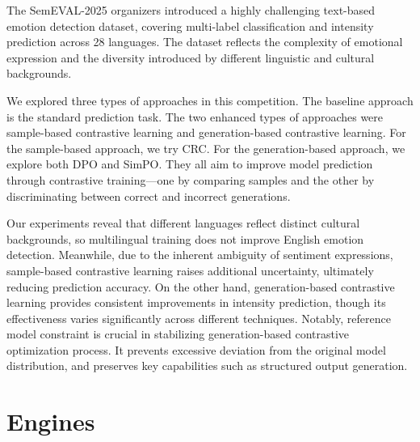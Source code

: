 \documentclass[11pt]{article}
\begin{document}
The SemEVAL-2025 organizers introduced a highly challenging text-based emotion detection dataset, covering multi-label classification and intensity prediction across 28 languages. The dataset reflects the complexity of emotional expression and the diversity introduced by different linguistic and cultural backgrounds.


We explored three types of approaches in this competition. The baseline approach is the standard prediction task. The two enhanced types of approaches were sample-based contrastive learning and generation-based contrastive learning. For the sample-based approach, we try CRC. For the generation-based approach, we explore both DPO and SimPO. They all aim to improve model prediction through contrastive training—one by comparing samples and the other by discriminating between correct and incorrect generations.


Our experiments reveal that different languages reflect distinct cultural backgrounds, so multilingual training does not improve English emotion detection. Meanwhile, due to the inherent ambiguity of sentiment expressions, sample-based contrastive learning raises additional uncertainty, ultimately reducing prediction accuracy. On the other hand, generation-based contrastive learning provides consistent improvements in intensity prediction, though its effectiveness varies significantly across different techniques. Notably, reference model constraint is crucial in stabilizing generation-based contrastive optimization process. It prevents excessive deviation from the original model distribution, and preserves key capabilities such as structured output generation.

\iffalse
\section{Engines}
\end{document}
